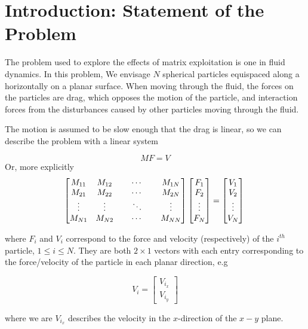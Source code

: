 \documentclass[paper=a4, fontsize=12pt]{scrartcl} %
\numberwithin{equation}{section}       %
\numberwithin{figure}{section}         %
\numberwithin{table}{section}          %
\begin{document}
\section*{Introduction: Statement of the Problem}

The problem used to explore the effects of matrix exploitation is one in fluid dynamics. In this problem, We envisage $N$ spherical particles equispaced along a horizontally on a planar surface. When moving through the fluid, the forces on the particles are drag, which opposes the motion of the particle, and interaction forces from the disturbances caused by other particles moving through the fluid. 

\indent The motion is assumed to be slow enough that the drag is linear, so we can describe the problem with a linear system 

$$ MF = V $$
Or, more explicitly 
$$
  \begin{bmatrix}
     M_{11} & M_{12} & \, &\cdots & \, & M_{1N} \\
     M_{21} & M_{22}  & \, &\cdots & \, & M_{2N} \\
     \vdots & \vdots & \, & \ddots & \,  & \vdots \\
     M_{N1} & M_{N2} & \,  & \cdots & \, & M_{NN}
  \end{bmatrix}
  \begin{bmatrix}
    F_1 \\
    F_2 \\
    \vdots \\
    F_N
  \end{bmatrix}
  =
  \begin{bmatrix}
    V_1 \\
    V_2  \\
    \vdots \\
    V_N 
  \end{bmatrix}
  \\
$$

\noindent where $F_i$ and $V_i$ correspond to the force and velocity (respectively) of the $i^{th}$ particle, $1 \leq i \leq N$. They are both $2\times1$ vectors with each entry corresponding to the force/velocity of the particle in each planar direction, e.g 

$$ V_i = 
\begin{bmatrix}
V_{i_{x}} \\
V_{i_{y}} 
\end{bmatrix} $$

\noindent where we are $V_{i_{x}}$ describes the velocity in the $x$-direction of the $x-y$ plane.\\
\end{document}
